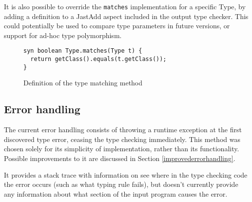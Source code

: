 \documentclass[nofilelist]{cslthse-msc}
\newcommand{\CR}[1]{\textcolor{green!60!black}{[\textbf{CR}:#1]}}
\begin{document}
It is also possible to override the \lstinline{matches} implementation for a specific Type, by adding a definition to a JastAdd aspect included in the output type checker.
This could potentially be used to compare type parameters in future versions, or support for ad-hoc type polymorphism.

\begin{figure}[h]
\begin{lstlisting}[language=jrag]
syn boolean Type.matches(Type t) {
  return getClass().equals(t.getClass());
}
\end{lstlisting}
  \caption{Definition of the type matching method}
  \label{typematches}
\end{figure}



\subsection{Error handling}\label{errorhandling}
The current error handling consists of throwing a runtime exception at the first discovered type error, ceasing the type checking immediately.
This method was chosen solely for its simplicity of implementation, rather than its functionality.
Possible improvements to it are discussed in Section \ref{improvederrorhandling}.

It provides a stack trace with information on see where in the type checking code the error occurs (such as what typing rule fails), but doesn't currently provide any information about what section of the input program causes the error.

\end{document}
